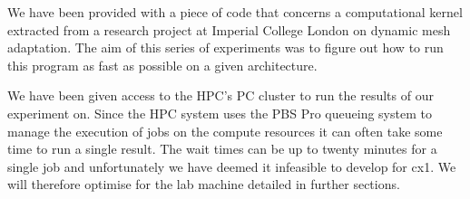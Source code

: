 We have been provided with a piece of code that concerns a computational kernel extracted from a research project at Imperial College London on dynamic mesh adaptation\cite{pragmatic}.
The aim of this series of experiments was to figure out how to run this program as fast as possible on a given architecture.

We have been given access to the HPC's PC cluster to run the results of our experiment on.
Since the HPC system uses the PBS Pro queueing system to manage the execution of jobs on the compute resources it can often take some time to run a single result. The wait times can be up to twenty minutes for a single job and unfortunately we have deemed it infeasible to develop for cx1. We will therefore optimise for the lab machine detailed in further sections.
